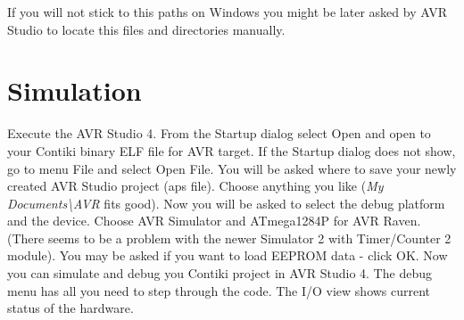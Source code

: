 \documentclass{article}
\begin{document}
If you will not stick to this paths on Windows you might be later asked by AVR Studio to locate this files and directories manually.


\section{Simulation}
Execute the AVR Studio 4. From the Startup dialog select Open and open to your Contiki binary ELF file for AVR target.
If the Startup dialog does not show, go to menu File and select Open File.
You will be asked where to save your newly created AVR Studio project (aps file).
Choose anything you like ({\it{My Documents\textbackslash AVR}} fits good).
Now you will be asked to select the debug platform and the device.
Choose AVR Simulator and ATmega1284P for AVR Raven. (There seems to be a problem with the newer Simulator 2 with Timer/Counter 2 module).
You may be asked if you want to load EEPROM data - click OK.
Now you can simulate and debug you Contiki project in AVR Studio 4.
The debug menu has all you need to step through the code. The I/O view shows current status of the hardware.
\end{document}
